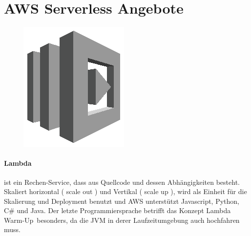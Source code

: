 \documentclass[
12pt,
english,
ngerman,
headsepline,
twoside,
openright,
numbers=noenddot,version=first
]{scrreprt}
\begin{document}
\section{AWS Serverless Angebote}
\begin{figure}
	\includegraphics[width=0.9\linewidth]{./pics/aws/Compute_GRAYSCALE_AWSLambda.eps}
\end{figure}
\paragraph{Lambda} ist ein Rechen-Service, dass aus Quellcode und dessen Abhängigkeiten besteht. Skaliert horizontal ( scale out ) und Vertikal ( scale up ), wird als Einheit für die Skalierung und Deployment benutzt und \acrshort{AWS} unterstützt Javascript, Python, C\# und Java. Der letzte Programmiersprache betrifft das Konzept \glqq Lambda Warm-Up\grqq\ besonders, da die \acrfull{JVM} in derer Laufzeitumgebung auch hochfahren muss.
\end{document}
